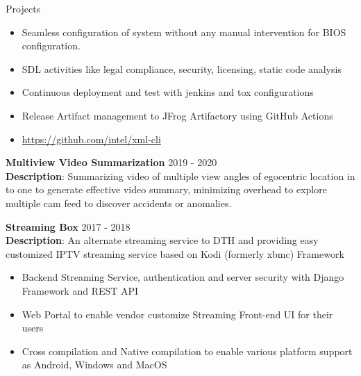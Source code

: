 \documentclass{resume} %
\begin{document}
\begin{rSection}{Projects}
\begin{itemize}
    \item Seamless configuration of system without any manual intervention for BIOS configuration.
    \item SDL activities like legal compliance, security, licensing, static code analysis
    \item Continuous deployment and test with jenkins and tox configurations
    \item Release Artifact management to JFrog Artifactory using GitHub Actions
    \item \href{https://github.com/intel/xml-cli}{https://github.com/intel/xml-cli}
\end{itemize}

\textbf{Multiview Video Summarization} \hfill {2019 - 2020}\\
\textbf{Description}: Summarizing video of multiple view angles of egocentric location in to one to generate effective video summary, minimizing overhead to explore multiple cam feed to discover accidents or anomalies.



\textbf{Streaming Box} \hfill {2017 - 2018}\\
\textbf{Description}: An alternate streaming service to DTH and providing easy customized IPTV streaming service based on Kodi (formerly xbmc) Framework

\begin{itemize}
    \item Backend Streaming Service, authentication and server security with Django Framework and REST API
    \item Web Portal to enable vendor customize Streaming Front-end UI for their users
    \item Cross compilation and Native compilation to enable various platform support as Android, Windows and MacOS
\end{itemize}

\end{rSection}
\end{document}
